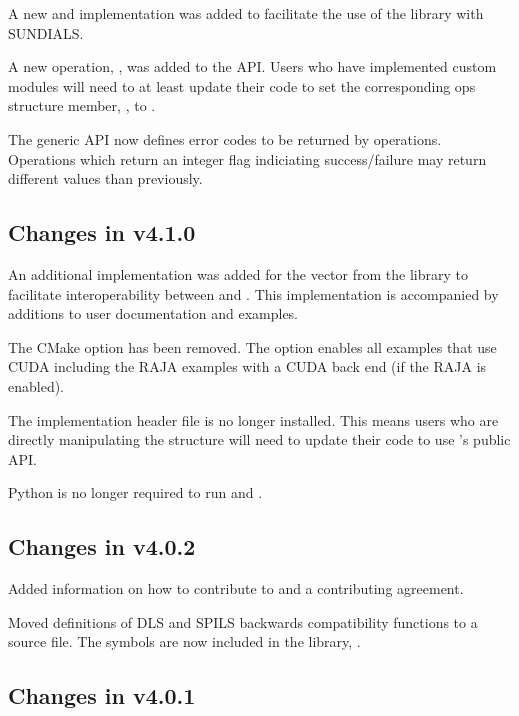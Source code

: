 A new {\sunmatrix} and {\sunlinsol} implementation was added to facilitate
the use of the {\superludist} library with SUNDIALS.

A new operation, , was added to the {\sunmatrix} API. Users
who have implemented custom {\sunmatrix} modules will need to at least update
their code to set the corresponding ops structure member, , to .

The generic {\sunmatrix} API now defines error codes to be returned by {\sunmatrix} operations.
Operations which return an integer flag indiciating success/failure may return different
values than previously.


\subsection*{Changes in v4.1.0}

An additional {\nvector} implementation was added for the
{\tpetra} vector from the {\trilinos} library to facilitate interoperability
between {\sundials} and {\trilinos}. This implementation is accompanied by
additions to user documentation and {\sundials} examples.

The  CMake option has been removed. The option 
enables all examples that use CUDA including the RAJA examples with a CUDA back end (if the RAJA
{\nvector} is enabled).

The implementation header file  is no longer installed. This means users
who are directly manipulating the  structure will need to update their code
to use {\kinsol}'s public API.

Python is no longer required to run  and .

\subsection*{Changes in v4.0.2}

Added information on how to contribute to {\sundials} and a contributing agreement.

Moved definitions of DLS and SPILS backwards compatibility functions to a source file.
The symbols are now included in the {\kinsol} library, .

\subsection*{Changes in v4.0.1}

